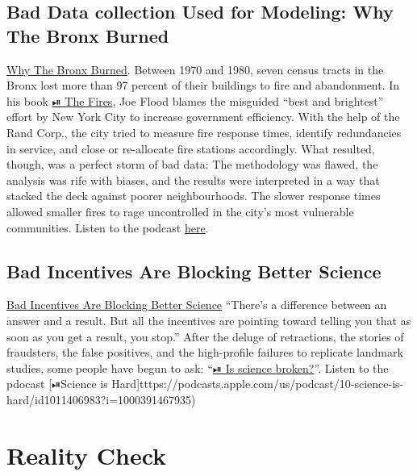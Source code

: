\documentclass[
  letterpaper,
  DIV=11,
  numbers=noendperiod]{scrreprt}
\begin{document}
\subsection{Bad Data collection Used for Modeling: Why The Bronx
Burned}\label{bad-data-collection-used-for-modeling-why-the-bronx-burned}

\href{https://fivethirtyeight.com/features/why-the-bronx-really-burned/}{Why
The Bronx Burned}. Between 1970 and 1980, seven census tracts in the
Bronx lost more than 97 percent of their buildings to fire and
abandonment. In his book
\href{https://www.amazon.com/Fires-Computer-Intentions-City-Determined/dp/1594485062}{⏯
The Fires}, Joe Flood blames the misguided ``best and brightest'' effort
by New York City to increase government efficiency. With the help of the
Rand Corp., the city tried to measure fire response times, identify
redundancies in service, and close or re-allocate fire stations
accordingly. What resulted, though, was a perfect storm of bad data: The
methodology was flawed, the analysis was rife with biases, and the
results were interpreted in a way that stacked the deck against poorer
neighbourhoods. The slower response times allowed smaller fires to rage
uncontrolled in the city's most vulnerable communities. Listen to the
podcast
\href{https://podcasts.apple.com/us/podcast/19-why-the-bronx-burned/id1011406983?i=1000391467912}{here}.

\subsection{Bad Incentives Are Blocking Better
Science}\label{bad-incentives-are-blocking-better-science}

\href{https://fivethirtyeight.com/features/podcast-bad-incentives-are-blocking-better-science/}{Bad
Incentives Are Blocking Better Science} ``There's a difference between
an answer and a result. But all the incentives are pointing toward
telling you that as soon as you get a result, you stop.'' After the
deluge of retractions, the stories of fraudsters, the false positives,
and the high-profile failures to replicate landmark studies, some people
have begun to ask:
``\href{https://fivethirtyeight.com/features/science-isnt-broken/}{⏯ Is
science broken?}''. Listen to the pdocast {[}⏯Science is
Hard{]}tttps://podcasts.apple.com/us/podcast/10-science-is-hard/id1011406983?i=1000391467935)

\section{Reality Check}\label{reality-check}
\end{document}
